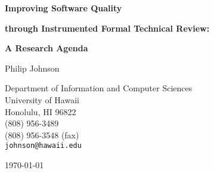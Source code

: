 \begin{titlepage}
\vspace*{1in}
\begin{center}
   
\Large

{\bf Improving Software Quality}   \medskip\par
{\bf through Instrumented Formal Technical Review:}  \medskip\par
{\bf A Research Agenda} \bigskip\par
                                      \bigskip\par



\normalsize

Philip Johnson                           \medskip\par
Department of Information and Computer Sciences\\ 
University of Hawaii\\ 
Honolulu, HI 96822\\                       
(808) 956-3489\\
(808) 956-3548 (fax)\\
{\tt johnson@hawaii.edu}                 \bigskip\par

\today                                   \bigskip\par



\end{center}
\end{titlepage}
